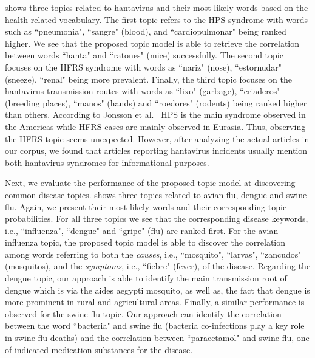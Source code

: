 \documentclass[twoside,leqno,twocolumn]{article}
\begin{document}
 shows three topics related to hantavirus and their most likely words based on the health-related vocabulary. 
The first topic refers to the HPS syndrome with words such as ``pneumonia", ``sangre" (blood), and ``cardiopulmonar" being ranked higher. We see that the proposed topic model is able to retrieve the correlation between words ``hanta" and ``ratones" (mice) successfully. The second topic focuses on the HFRS syndrome with words as  ``nariz" (nose), ``estornudar" (sneeze), ``renal" being more prevalent. Finally, the third topic focuses on the hantavirus transmission routes with words as ``lixo" (garbage), ``criaderos" (breeding places), ``manos" (hands) and ``roedores" (rodents) being ranked higher than others. According to Jonsson et al.~\cite{jonsson:10} HPS is the main syndrome observed in the Americas while HFRS cases are mainly observed in Eurasia. Thus, observing the HFRS topic seems unexpected. However, after analyzing the actual articles in our corpus, we found that articles reporting hantavirus incidents usually mention both hantavirus syndromes for informational purposes. 

Next, we evaluate the performance of the proposed topic model at discovering common disease topics.  shows three topics related to avian flu, dengue and swine flu. Again, we present their most likely words and their corresponding topic probabilities. For all three topics we see that the corresponding disease keywords, i.e., ``influenza",  ``dengue" and ``gripe" (flu) are ranked first. For the avian influenza topic, the proposed topic model is able to discover the correlation among words referring to both the {\em causes}, i.e., ``mosquito", ``larvas", ``zancudos" (mosquitos), and the {\em symptoms}, i.e., ``fiebre" (fever), of the disease. Regarding the dengue topic, our approach is able to identify the main transmission root of dengue which is via the aides aegypti mosquito, as well as, the fact that dengue is more prominent in rural and agricultural areas. Finally, a similar performance is observed for the swine flu topic. Our approach can identify the correlation between the word ``bacteria" and swine flu (bacteria co-infections play a key role in swine flu deaths) and the correlation between ``paracetamol" and swine flu, one of indicated medication substances for the disease.
\end{document}
